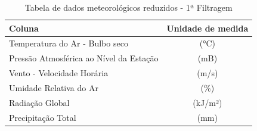 \begin{table}[H]
	\centering
	\begin{tabular}{|p{10cm}|c|}
	\hline
	\textbf{Coluna} & \textbf{Unidade de medida} \\
	\hline
	Temperatura do Ar - Bulbo seco & (°C) \\
	Pressão Atmosférica ao Nível da Estação & (mB) \\
	Vento - Velocidade Horária & (m/s) \\
	Umidade Relativa do Ar & (\%) \\
	Radiação Global & (kJ/m²) \\
	Precipitação Total & (mm) \\
	\hline
	\end{tabular}
	\caption{Tabela de dados meteorológicos reduzidos - 1ª Filtragem}
	\label{tab:colunas_dados_meteorologicos_reduzidas}
\end{table}

